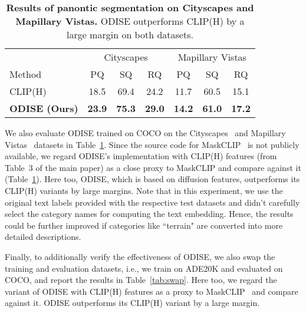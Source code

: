 \documentclass[10pt,twocolumn,letterpaper]{article}
\newcommand{\tablestyle}[2]{\setlength{\tabcolsep}{#1}\renewcommand{\arraystretch}{#2}\centering\small}
\newcommand{\ourmethod}{ODISE}
\begin{document}
\begin{table}[!h]
\tablestyle{6pt}{1.1}
\vspace{-1.2em}
\begin{tabular}{l|ccc|ccc}
                              & \multicolumn{3}{c|}{Cityscapes}                & \multicolumn{3}{c}{Mapillary Vistas}          \\
   Method                    & PQ            & SQ            & RQ            & PQ            & SQ            & RQ            \\
   \shline
   CLIP(H)                   & 18.5          & 69.4          & 24.2          & 11.7          & 60.5          & 15.1          \\
   \textbf{\ourmethod{} (Ours)} & \textbf{23.9} & \textbf{75.3} & \textbf{29.0} & \textbf{14.2} & \textbf{61.0} & \textbf{17.2}
\end{tabular}
\vspace{-.5em}
\caption{
    \label{tab:cs}
    \textbf{Results of panontic segmentation on Cityscapes and Mapillary Vistas.} \ourmethod{} outperforms CLIP(H) by a large margin on both datasets.
}
\vspace{-1.em}
\end{table}

We also evaluate \ourmethod{} trained on COCO on the Cityscapes~\cite{cordts2016cityscapes} and Mapillary Vistas~\cite{neuhold2017mapillary} datasets in Table~\ref{tab:cs}. Since the source code for MaskCLIP~\cite{ding2022open} is not  publicly available, we regard \ourmethod{}'s implementation with CLIP(H) features (from Table~3 of the main paper) as a close proxy to MaskCLIP and compare against it (Table~\ref{tab:cs}). Here too, \ourmethod{}, which is based on diffusion features, outperforms its CLIP(H) variants by large margins. Note that in this experiment, we use the original text labels provided with the respective test datasets and didn't carefully select the category names for computing the text embedding. Hence, the results could be further improved if categories like ``terrain" are converted into more detailed descriptions.




Finally, to additionally verify the effectiveness of \ourmethod{}, we also swap the training and evaluation datasets, i.e., we train on ADE20K and evaluated on COCO, and report the results in Table~\ref{tab:swap}. Here too, we regard the variant of \ourmethod{} with CLIP(H) features as a proxy to MaskCLIP~\cite{ding2022open} and compare against it. \ourmethod{} outperforms its CLIP(H) variant by a large margin.
\end{document}
